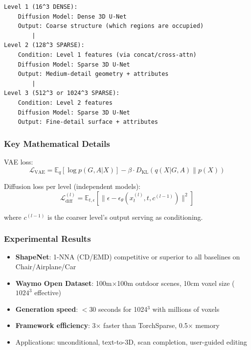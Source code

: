 \documentclass[11pt, a4paper]{article}
\begin{document}
\begin{lstlisting}[style=flowchart, caption={XCube Hierarchical Generation}]
Level 1 (16^3 DENSE):
    Diffusion Model: Dense 3D U-Net
    Output: Coarse structure (which regions are occupied)
        |
Level 2 (128^3 SPARSE):
    Condition: Level 1 features (via concat/cross-attn)
    Diffusion Model: Sparse 3D U-Net
    Output: Medium-detail geometry + attributes
        |
Level 3 (512^3 or 1024^3 SPARSE):
    Condition: Level 2 features
    Diffusion Model: Sparse 3D U-Net
    Output: Fine-detail surface + attributes
\end{lstlisting}

\subsubsection{Key Mathematical Details}

VAE loss:
\begin{equation}
    \mathcal{L}_{\text{VAE}} = \mathbb{E}_{q}[\log p(G,A|X)] - \beta \cdot D_{\text{KL}}(q(X|G,A) \| p(X))
\end{equation}

Diffusion loss per level (independent models):
\begin{equation}
    \mathcal{L}_{\text{diff}}^{(l)} = \mathbb{E}_{t,\epsilon}\left[\|\epsilon - \epsilon_\theta(x_t^{(l)}, t, c^{(l-1)})\|^2\right]
\end{equation}

where $c^{(l-1)}$ is the coarser level's output serving as conditioning.

\subsubsection{Experimental Results}

\begin{itemize}
    \item \textbf{ShapeNet}: 1-NNA (CD/EMD) competitive or superior to all baselines on Chair/Airplane/Car
    \item \textbf{Waymo Open Dataset}: 100m$\times$100m outdoor scenes, 10cm voxel size ($1024^3$ effective)
    \item \textbf{Generation speed}: $<30$ seconds for 1024$^3$ with millions of voxels
    \item \textbf{Framework efficiency}: 3$\times$ faster than TorchSparse, 0.5$\times$ memory
    \item Applications: unconditional, text-to-3D, scan completion, user-guided editing
\end{itemize}
\end{document}
